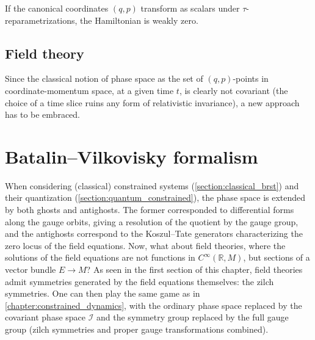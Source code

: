     \begin{property}
        If the canonical coordinates $(q,p)$ transform as scalars under $\tau$-reparametrizations, the Hamiltonian is weakly zero.
    \end{property}

\subsection{Field theory}

    Since the classical notion of phase space as the set of $(q,p)$-points in coordinate-momentum space, at a given time $t$, is clearly not covariant (the choice of a time slice ruins any form of relativistic invariance), a new approach has to be embraced.


\section{Batalin--Vilkovisky formalism}\label{section:BV_formalism}

    When considering (classical) constrained systems (\cref{section:classical_brst}) and their quantization (\cref{section:quantum_constrained}), the phase space is extended by both ghosts and antighosts. The former corresponded to differential forms along the gauge orbits, giving a resolution of the quotient by the gauge group, and the antighosts correspond to the Koszul--Tate generators characterizing the zero locus of the field equations. Now, what about field theories, where the solutions of the field equations are not functions in $C^\infty(\mathbb{R},M)$, but sections of a vector bundle $E\rightarrow M$? As seen in the first section of this chapter, field theories admit symmetries generated by the field equations themselves: the zilch symmetries. One can then play the same game as in \cref{chapter:constrained_dynamics}, with the ordinary phase space replaced by the covariant phase space $\mathcal{I}$ and the symmetry group replaced by the full gauge group (zilch symmetries and proper gauge transformations combined).

